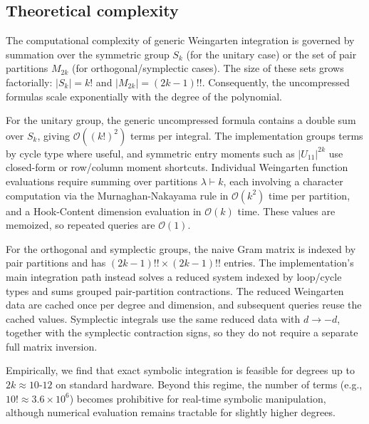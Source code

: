 \documentclass[manuscript,screen]{acmart}
\begin{document}
\subsection{Theoretical complexity}
The computational complexity of generic Weingarten integration is governed by
summation over the symmetric group $S_k$ (for the unitary case) or the set of
pair partitions $M_{2k}$ (for orthogonal/symplectic cases). The size of these
sets grows factorially: $|S_k| = k!$ and $|M_{2k}| = (2k-1)!!$. Consequently,
the uncompressed formulas scale exponentially with the degree of the
polynomial.

For the unitary group, the generic uncompressed formula contains a double sum
over $S_k$, giving $\mathcal{O}((k!)^2)$ terms per integral. The implementation
groups terms by cycle type where useful, and symmetric entry moments such as
$|U_{11}|^{2k}$ use closed-form or row/column moment shortcuts.
Individual Weingarten function evaluations require summing over partitions
$\lambda \vdash k$, each involving a character computation via the
Murnaghan-Nakayama rule in $\mathcal{O}(k^2)$ time per partition, and a
Hook-Content dimension evaluation in $\mathcal{O}(k)$ time. These values are
memoized, so repeated queries are $\mathcal{O}(1)$.

For the orthogonal and symplectic groups, the naive Gram matrix is indexed by
pair partitions and has $(2k-1)!! \times (2k-1)!!$ entries. The implementation's
main integration path instead solves a reduced system indexed by loop/cycle
types and sums grouped pair-partition contractions. The reduced Weingarten data
are cached once per degree and dimension, and subsequent queries reuse the
cached values. Symplectic integrals use the same reduced data with
$d \to -d$, together with the symplectic contraction signs, so they do not
require a separate full matrix inversion.

Empirically, we find that exact symbolic integration is feasible for degrees up
to $2k \approx 10\text{-}12$ on standard hardware. Beyond this regime, the number of
terms (e.g., $10! \approx 3.6 \times 10^6$) becomes prohibitive for real-time
symbolic manipulation, although numerical evaluation remains tractable for
slightly higher degrees.
\end{document}
